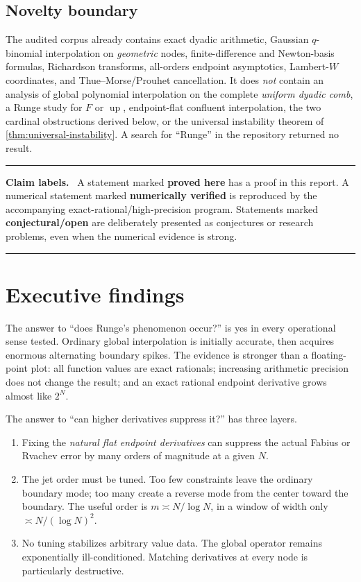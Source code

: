 \documentclass[11pt,oneside]{article}
\numberwithin{equation}{section}
\theoremstyle{definition}
\theoremstyle{remark}
\newcommand{\upf}{\operatorname{up}}
\newcommand{\statusproved}{\textcolor{deepgreen}{\textbf{proved here}}}
\newcommand{\statusnumeric}{\textcolor{linkblue}{\textbf{numerically verified}}}
\newcommand{\statusopen}{\textcolor{deepred}{\textbf{conjectural/open}}}
\newenvironment{statusbox}[1]{%
  \par\medskip\noindent\begin{center}\begin{minipage}{0.94\textwidth}%
  \color{linkblue}\hrule\vspace{0.65em}%
  \color{black}\textbf{\color{linkblue}#1.}\ }{%
  \par\vspace{0.65em}\color{linkblue}\hrule
  \end{minipage}\end{center}\medskip}
\begin{document}
\subsection{Novelty boundary}

The audited corpus already contains exact dyadic arithmetic, Gaussian $q$-binomial
interpolation on \emph{geometric} nodes, finite-difference and Newton-basis formulas,
Richardson transforms, all-orders endpoint asymptotics, Lambert-$W$ coordinates, and
Thue--Morse/Prouhet cancellation.  It does \emph{not} contain an analysis of global
polynomial interpolation on the complete \emph{uniform dyadic comb}, a Runge study for
$F$ or $\upf$, endpoint-flat confluent interpolation, the two cardinal obstructions derived
below, or the universal instability theorem of \cref{thm:universal-instability}.  A search
for ``Runge'' in the repository returned no result.

\begin{statusbox}{Claim labels}
A statement marked \statusproved{} has a proof in this report.  A numerical statement
marked \statusnumeric{} is reproduced by the accompanying exact-rational/high-precision
program.  Statements marked \statusopen{} are deliberately presented as conjectures or
research problems, even when the numerical evidence is strong.
\end{statusbox}

\section{Executive findings}
\label{sec:executive}

The answer to ``does Runge's phenomenon occur?'' is yes in every operational sense tested.
Ordinary global interpolation is initially accurate, then acquires enormous alternating
boundary spikes.  The evidence is stronger than a floating-point plot: all function values
are exact rationals; increasing arithmetic precision does not change the result; and an
exact rational endpoint derivative grows almost like $2^N$.

The answer to ``can higher derivatives suppress it?'' has three layers.
\begin{enumerate}
\item Fixing the \emph{natural flat endpoint derivatives} can suppress the actual Fabius or
      Rvachev error by many orders of magnitude at a given $N$.
\item The jet order must be tuned.  Too few constraints leave the ordinary boundary mode;
      too many create a reverse mode from the center toward the boundary.  The useful order
      is $m\asymp N/\log N$, in a window of width only $\asymp N/(\log N)^2$.
\item No tuning stabilizes arbitrary value data.  The global operator remains exponentially
      ill-conditioned.  Matching derivatives at every node is particularly destructive.
\end{enumerate}
\end{document}

